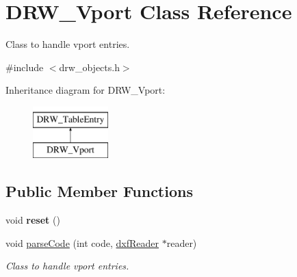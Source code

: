 \hypertarget{classDRW__Vport}{\section{D\-R\-W\-\_\-\-Vport Class Reference}
\label{classDRW__Vport}
}


Class to handle vport entries.  




{\ttfamily \#include $<$drw\-\_\-objects.\-h$>$}

Inheritance diagram for D\-R\-W\-\_\-\-Vport\-:\begin{figure}[H]
\begin{center}
\leavevmode
\includegraphics[height=2.000000cm]{classDRW__Vport}
\end{center}
\end{figure}
\subsection*{Public Member Functions}
\begin{DoxyCompactItemize}
\item 
\hypertarget{classDRW__Vport_a4cf8e9edfc41ae262ac89cc3cba6d96b}{void {\bfseries reset} ()}\label{classDRW__Vport_a4cf8e9edfc41ae262ac89cc3cba6d96b}

\item 
void \hyperlink{classDRW__Vport_a7f865bb07bda60869ece9c15b7ceb186}{parse\-Code} (int code, \hyperlink{classdxfReader}{dxf\-Reader} $\ast$reader)
\begin{DoxyCompactList}\small\item\em Class to handle vport entries. \end{DoxyCompactList}\end{DoxyCompactItemize}
